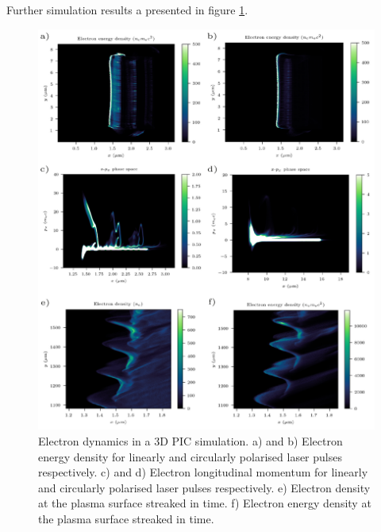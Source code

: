 Further simulation results a presented in figure \ref{fig:zvp3ddynamics}.

\begin{figure}
	\centering
	\includegraphics[width=1\linewidth]{figures/zvp/zvp_3D_dynamics}
	\caption[Electron dynamics in 3D PIC simulation for both linear and cirularly polarised relativistic laser pulses.]{Electron dynamics in a 3D PIC simulation. a) and b) Electron energy density for linearly and circularly polarised laser pulses respectively. c) and d) Electron longitudinal momentum for linearly and circularly polarised laser pulses respectively.  e) Electron density at the plasma surface streaked in time. f) Electron energy density at the plasma surface streaked in time.}
	\label{fig:zvp3ddynamics}
\end{figure}

